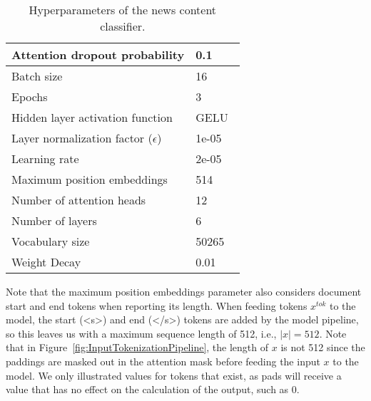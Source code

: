 \begin{table}
    \centering
    \begin{tabular}{|l|l|}
        \hline
        Attention dropout probability           & 0.1                             \\
        \hline
        Batch size                              & 16                              \\
        \hline
        Epochs                                  & 3                               \\
        \hline
        Hidden layer activation function        & GELU~\parencite{GELU_Hendrycks} \\
        \hline
        Layer normalization factor ($\epsilon$) & 1e-05                           \\
        \hline
        Learning rate                           & 2e-05                           \\
        \hline
        Maximum position embeddings             & 514                             \\
        \hline
        Number of attention heads               & 12                              \\
        \hline
        Number of layers                        & 6                               \\
        \hline
        Vocabulary size                         & 50265                           \\
        \hline
        Weight Decay                            & 0.01                            \\
        \hline
    \end{tabular}
    \caption[Hyperparameters of the news content classifier.]{Hyperparameters of the news content classifier.}
    \label{tab:newsContentModelHyperparameters}
\end{table}
Note that the maximum position embeddings parameter also considers document start and end tokens when reporting its length. When feeding tokens $x^{tok}$ to the model, the start (<s>) and end (</s>) tokens are added by the model pipeline, so this leaves us with a maximum sequence length of 512, i.e., $|x|=512$. Note that in Figure~\ref{fig:InputTokenizationPipeline}, the length of $x$ is not 512 since the paddings are masked out in the attention mask before feeding the input $x$ to the model. We only illustrated values for tokens that exist, as pads will receive a value that has no effect on the calculation of the output, such as 0. \\
